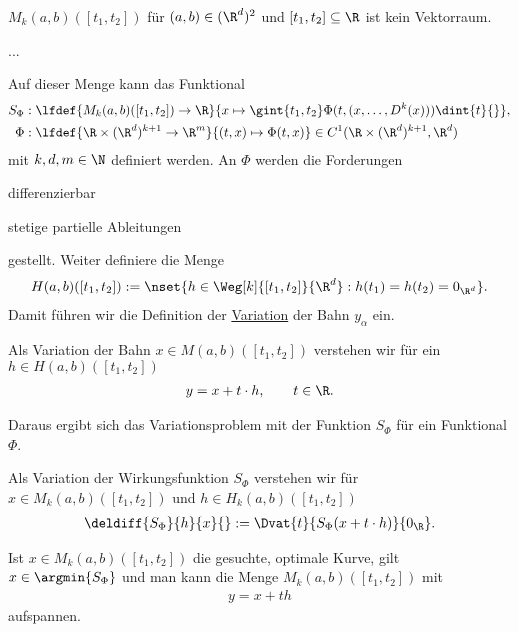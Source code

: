 \documentclass[../WiSe22ANA3.tex]{subfiles}
\begin{document}
\begin{hintergrund}
 	 		\begin{Behauptung}
 	 			$M_k(a,b)([t_1,t_2])$ für $(a,b)\in(\R^d)^2$ und $[t_1,t_2]\subseteq\R$ ist kein Vektorraum.  
 	 		\end{Behauptung}
 	 		\begin{begruendung}
 	 			...
 	 		\end{begruendung}
 	 		\noindent Auf dieser Menge kann das Funktional 
 	 		\begin{align*}
 	 			S_\Phi&:\lfdef{M_k(a,b)([t_1,t_2])\to\R}{x\mapsto \gint{t_1,t_2}\Phi(t,(x,\dots,D^k(x)))\dint{t}{}}, \\
 	 			\Phi&:\lfdef{\R\times (\R^d)^{k+1}\to \R^m}{(t,x)\mapsto \Phi(t,x)} \in C^1(\R\times (\R^d)^{k+1},\R^d)
 	 		\end{align*}
 	 		mit $k,d,m\in\N$ definiert werden. An $\Phi$ werden die Forderungen
 	 		\begin{clist}
 	 			\item differenzierbar
 	 			\item stetige partielle Ableitungen
 	 		\end{clist}
 	 		gestellt. Weiter definiere die Menge
 	 		\begin{align*}
 	 			H(a,b)([t_1,t_2]):=\nset{h\in\Weg[k]{[t_1,t_2]}{\R^d}:h(t_1)=h(t_2)=0_{\R^d}}. 
 	 		\end{align*}
 	 		Damit führen wir die Definition der \underline{Variation} der Bahn $y_\alpha$ ein.
 	 		\begin{info}[Bahnvariation]
 	 			Als Variation der Bahn $x\in M(a,b)([t_1,t_2])$ verstehen wir für ein $h\in H(a,b)([t_1,t_2])$
 	 			\begin{align*}
 	 				y=x+t\cdot h, \qquad t\in\R.
 	 			\end{align*} 
 	 		\end{info}
 	 		Daraus ergibt sich das Variationsproblem mit der Funktion $S_\Phi$ für ein Funktional $\Phi$.  
 	 		\begin{info}[Wirkungsvariation]
 	 			Als Variation der Wirkungsfunktion $S_\Phi$ verstehen wir für $x\in M_k(a,b)([t_1,t_2])$ und $h\in H_k(a,b)([t_1,t_2])$ 
 	 			\begin{align*}
 	 				\deldiff{S_\Phi}{h}{x}{}:=\Dvat{t}{S_\Phi(x+t\cdot h)}{0_\R}.
 	 			\end{align*}
 	 		\end{info}
 	 		\begin{verm}
 	 			Ist $x\in M_k(a,b)([t_1,t_2])$ die gesuchte, optimale Kurve, gilt $x\in\argmin{S_\Phi}$ und man kann die Menge $M_k(a,b)([t_1,t_2])$ mit 
 	 			\begin{align*}
 	 				y=x+th
 	 			\end{align*}
 	 			aufspannen. 
 	 		\end{verm} 
 	 	\end{hintergrund}
\end{document}
